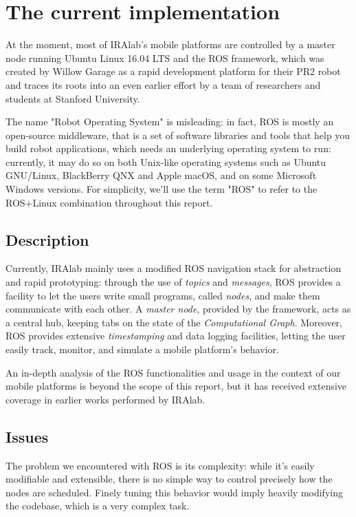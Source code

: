 \documentclass[a4paper,12pt]{report}
\begin{document}
\section{The current implementation}

At the moment, most of IRAlab's mobile platforms are controlled by a master node running Ubuntu Linux 16.04 LTS and the ROS framework, which was created by Willow Garage as a rapid development platform for their PR2 robot and traces its roots into an even earlier effort by a team of researchers and students at Stanford University. 

The name "Robot Operating System" is misleading: in fact, ROS is mostly an open-source middleware, that is a set of software libraries and tools that help you build robot applications, which needs an underlying operating system to run: currently, it may do so on both Unix-like operating systems such as Ubuntu GNU/Linux, BlackBerry QNX \cite{qnx-ros} and Apple macOS, and on some Microsoft Windows versions. For simplicity, we'll use the term "ROS" to refer to the ROS+Linux combination throughout this report.

\subsection{Description}

Currently, IRAlab mainly uses a modified ROS navigation stack for abstraction and rapid prototyping: through the use of \textit{topics} and \textit{messages}, ROS provides a facility to let the users write small programs, called \textit{nodes}, and make them communicate with each other. A \textit{master node}, provided by the framework, acts as a central hub, keeping tabs on the state of the \textit{Computational Graph}. Moreover, ROS provides extensive \textit{timestamping} and data logging facilities, letting the user easily track, monitor, and simulate a mobile platform's behavior.

An in-depth analysis of the ROS functionalities and usage in the context of our mobile platforms is beyond the scope of this report, but it has received extensive coverage in earlier works performed by IRAlab.

\subsection{Issues}

The problem we encountered with ROS is its complexity: while it's easily modifiable and extensible, there is no simple way to control precisely how the nodes are scheduled. Finely tuning this behavior would imply heavily modifying the codebase, which is a very complex task.
\end{document}

